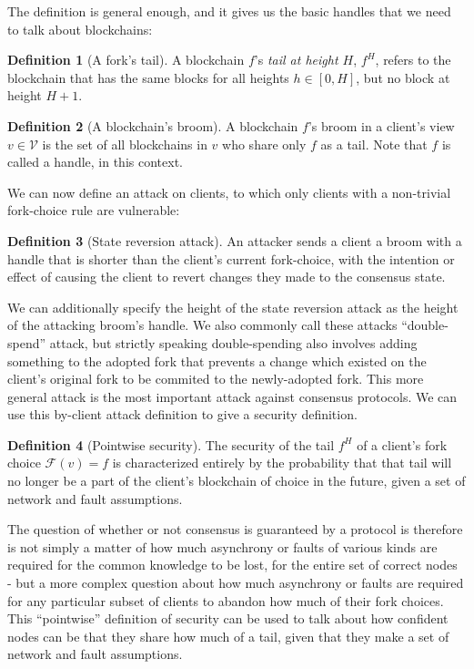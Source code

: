 \documentclass[11pt,a4paper]{article}
\theoremstyle{plain}
\theoremstyle{definition}
\newtheorem{defn}{Definition}
\begin{document}
The definition is general enough, and it gives us the basic handles that we need to talk about blockchains:

\begin{defn}[A fork's tail]
A blockchain $f$'s \emph{tail at height $H$}, $f^H$, refers to the blockchain that has the same blocks for all heights $h \in [0,H]$, but no block at height $H + 1$.
\end{defn}

\begin{defn}[A blockchain's broom]
A blockchain $f$'s broom in a client's view $v \in \mathcal{V}$ is the set of all blockchains in $v$ who share only $f$ as a tail. Note that $f$ is called a handle, in this context.
\end{defn}

We can now define an attack on clients, to which only clients with a non-trivial fork-choice rule are vulnerable:

\begin{defn}[State reversion attack]
An attacker sends a client a broom with a handle that is shorter than the client's current fork-choice, with the intention or effect of causing the client to revert changes they made to the consensus state.
\end{defn}

We can additionally specify the height of the state reversion attack as the height of the attacking broom's handle. We also commonly call these attacks ``double-spend'' attack, but strictly speaking double-spending also involves adding something to the adopted fork that prevents a change which existed on the client's original fork to be commited to the newly-adopted fork. This more general attack is the most important attack against consensus protocols. We can use this by-client attack definition to give a security definition.

\begin{defn}[Pointwise security]
The security of the tail $f^H$ of a client's fork choice $\mathcal{F}(v) = f$ is characterized entirely by the probability that that tail will no longer be a part of the client's blockchain of choice in the future, given a set of network and fault assumptions. 
\end{defn}

The question of whether or not consensus is guaranteed by a protocol is therefore is not simply a matter of how much asynchrony or faults of various kinds are required for the common knowledge to be lost, for the entire set of correct nodes - but a more complex question about how much asynchrony or faults are required for any particular subset of clients to abandon how much of their fork choices. This ``pointwise'' definition of security can be used to talk about how confident nodes can be that they share how much of a tail, given that they make a set of network and fault assumptions. 
\end{document}
